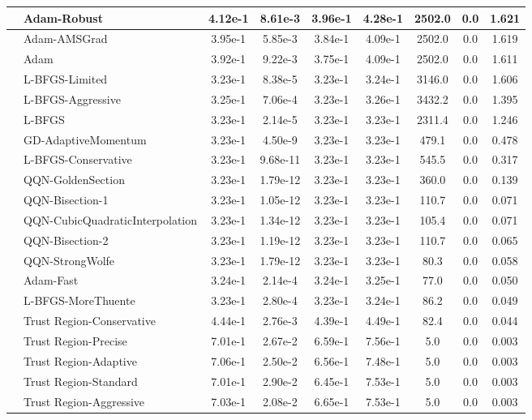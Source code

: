 \documentclass[10pt]{article}
\begin{document}
\begin{longtable}{|l|l|c|c|c|c|c|c|c|}
\hline
 & Adam-Robust & 4.12e-1 & 8.61e-3 & 3.96e-1 & 4.28e-1 & 2502.0 & 0.0 & 1.621 \\
\hline
 & Adam-AMSGrad & 3.95e-1 & 5.85e-3 & 3.84e-1 & 4.09e-1 & 2502.0 & 0.0 & 1.619 \\
\hline
 & Adam & 3.92e-1 & 9.22e-3 & 3.75e-1 & 4.09e-1 & 2502.0 & 0.0 & 1.611 \\
\hline
 & L-BFGS-Limited & 3.23e-1 & 8.38e-5 & 3.23e-1 & 3.24e-1 & 3146.0 & 0.0 & 1.606 \\
\hline
 & L-BFGS-Aggressive & 3.25e-1 & 7.06e-4 & 3.23e-1 & 3.26e-1 & 3432.2 & 0.0 & 1.395 \\
\hline
 & L-BFGS & 3.23e-1 & 2.14e-5 & 3.23e-1 & 3.23e-1 & 2311.4 & 0.0 & 1.246 \\
\hline
 & GD-AdaptiveMomentum & 3.23e-1 & 4.50e-9 & 3.23e-1 & 3.23e-1 & 479.1 & 0.0 & 0.478 \\
\hline
 & L-BFGS-Conservative & 3.23e-1 & 9.68e-11 & 3.23e-1 & 3.23e-1 & 545.5 & 0.0 & 0.317 \\
\hline
 & QQN-GoldenSection & 3.23e-1 & 1.79e-12 & 3.23e-1 & 3.23e-1 & 360.0 & 0.0 & 0.139 \\
\hline
 & QQN-Bisection-1 & 3.23e-1 & 1.05e-12 & 3.23e-1 & 3.23e-1 & 110.7 & 0.0 & 0.071 \\
\hline
 & QQN-CubicQuadraticInterpolation & 3.23e-1 & 1.34e-12 & 3.23e-1 & 3.23e-1 & 105.4 & 0.0 & 0.071 \\
\hline
 & QQN-Bisection-2 & 3.23e-1 & 1.19e-12 & 3.23e-1 & 3.23e-1 & 110.7 & 0.0 & 0.065 \\
\hline
 & QQN-StrongWolfe & 3.23e-1 & 1.79e-12 & 3.23e-1 & 3.23e-1 & 80.3 & 0.0 & 0.058 \\
\hline
 & Adam-Fast & 3.24e-1 & 2.14e-4 & 3.24e-1 & 3.25e-1 & 77.0 & 0.0 & 0.050 \\
\hline
 & L-BFGS-MoreThuente & 3.23e-1 & 2.80e-4 & 3.23e-1 & 3.24e-1 & 86.2 & 0.0 & 0.049 \\
\hline
 & Trust Region-Conservative & 4.44e-1 & 2.76e-3 & 4.39e-1 & 4.49e-1 & 82.4 & 0.0 & 0.044 \\
\hline
 & Trust Region-Precise & 7.01e-1 & 2.67e-2 & 6.59e-1 & 7.56e-1 & 5.0 & 0.0 & 0.003 \\
\hline
 & Trust Region-Adaptive & 7.06e-1 & 2.50e-2 & 6.56e-1 & 7.48e-1 & 5.0 & 0.0 & 0.003 \\
\hline
 & Trust Region-Standard & 7.01e-1 & 2.90e-2 & 6.45e-1 & 7.53e-1 & 5.0 & 0.0 & 0.003 \\
\hline
 & Trust Region-Aggressive & 7.03e-1 & 2.08e-2 & 6.65e-1 & 7.53e-1 & 5.0 & 0.0 & 0.003 \\

\end{longtable}
\end{document}
